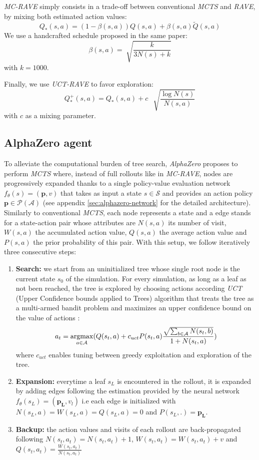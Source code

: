 \documentclass[journal, a4paper]{IEEEtran}
\newcommand{\argmax}{\operatornamewithlimits{argmax}}
\begin{document}
\textit{MC-RAVE} simply consists in a trade-off between conventional \textit{MCTS} and \textit{RAVE}, by mixing both estimated action values:
$$Q_*(s,a) = (1-\beta(s,a))Q(s,a) + \beta(s,a)\tilde Q(s,a)$$
We use a handcrafted schedule proposed in the same paper\cite{mc-rave}:
$$\beta(s,a) = \sqrt[]{\frac{k}{3N(s)+k}}$$
with $k=1000$.

Finally, we use \textit{UCT-RAVE} \cite{mc-rave} to favor exploration:
$$Q_*^+(s,a) = Q_*(s,a) + c\:\:\sqrt[]{\frac{\log N(s)}{N(s,a)}}$$
with $c$  as a mixing parameter.

\subsection{AlphaZero agent}
\label{ssec:alphazero}
    To alleviate the computational burden of tree search, \textit{AlphaZero}\cite{alphazero} proposes to perform \textit{MCTS} where, instead of full rollouts like in \textit{MC-RAVE}, nodes are progressively expanded thanks to a single policy-value evaluation network $f_\theta(s)=(\mathbf{p}, v)$ that takes as input a state $s\in \mathcal{S}$ and provides an action policy $\mathbf{p}\in\mathcal{P}(\mathcal{A})$ (see appendix \ref{sec:alphazero-network} for the detailed architecture). Similarly to conventional \textit{MCTS}, each node represents a state and a edge stands for a state-action pair whose attributes are $N(s,a)$ its number of visit, $W(s,a)$ the accumulated action value, $Q(s,a)$ the average action value and $P(s,a)$ the prior probability of this pair. With this setup, we follow iteratively three consecutive steps:
    \begin{enumerate}
        \item \textbf{Search:} we start from an uninitialized tree whose single root node is the current state $s_0$ of the simulation. For every simulation, as long as a leaf as not been reached, the tree is explored by choosing actions according \textit{UCT} (Upper Confidence bounds applied to Trees) algorithm that treats the tree as a multi-armed bandit problem and maximizes an upper confidence bound on the value of actions : $$a_t=\argmax_{a\in\mathcal{A}}(Q(s_t, a)+c_{uct}P(s_t,a)\frac{\sqrt{\sum_{b\in\mathcal{A}}N(s_t, b)}}{1+N(s_t,a)})$$ where $c_{uct}$ enables tuning between greedy exploitation and exploration of the tree.
        \item \textbf{Expansion:} everytime a leaf $s_L$ is encountered in the rollout, it is expanded by adding edges following the estimation provided by the neural network $f_\theta(s_L)=(\mathbf{p_L}, v_l)$ i.e each edge is initialized with $N(s_L, a)=W(s_L,a)=Q(s_L,a)=0$ and $P(s_L,.)=\mathbf{p_L}$.
        \item \textbf{Backup:} the action values and visits of each rollout are back-propagated following $N(s_t, a_t) = N(s_t, a_t) + 1$, $W(s_t, a_t) = W(s_t, a_t) + v$ and $Q(s_t, a_t)=\frac{W(s_t, a_t)}{N(s_t, a_t)}$
    \end{enumerate}
\end{document}
